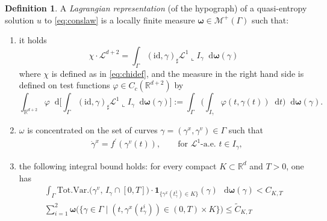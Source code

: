 \documentclass[11pt, twoside, reqno]{amsart}
\theoremstyle{definition}
\newtheorem{defi}[thm]{Definition}
\theoremstyle{remark}
\numberwithin{equation}{section}
\newcommand*\dif{\mathop{}\!\mathrm{d}}
\newcommand{\bs}[1]{\boldsymbol{#1}}
\newcommand{\msc}[1]{\mathscr{#1}}
\newcommand{\wt}[1]{\widetilde{#1}}
\begin{document}
\begin{defi}\label{def:lagrangianrep}
A \textit{Lagrangian representation} (of the hypograph) of a quasi-entropy solution $u$ to \eqref{eq:conslaw} is a locally finite measure $\bs \omega \in \msc {M}^+(\Gamma)$ such that:
\begin{enumerate}
    \item it holds
    \begin{equation}\label{eq:deflagromega}
        \chi \cdot \mathscr L^{d+2} = \int_{\Gamma} (\mathrm{id}, \gamma)_{\sharp} \mathscr L^1 \llcorner I_{\gamma} \dif \bs \omega(\gamma)
    \end{equation}
    where $\chi$ is defined as in \eqref{eq:chidef}, and the measure in the right hand side is defined on test functions $\varphi \in  C_c(\mathbb R^{d+2})$ by
    $$
    \int_{\mathbb R^{d+2}} \varphi \dif \Big[ \int_{\Gamma} (\mathrm{id}, \gamma)_{\sharp} \mathscr L^1 \llcorner I_{\gamma} \dif \bs \omega(\gamma)\Big] := \int_\Gamma \Big( \int_{I_\gamma} \varphi(t,\gamma(t)) \dif t\Big) \dif \bs \omega(\gamma).
    $$
    \item $\omega$ is concentrated on the set of curves $\gamma = (\gamma^x, \gamma^v) \in \Gamma$ such that 
    \begin{equation}\label{eq:charaeqla}
    \begin{aligned}
   &  \dot{\gamma}^x = f^{\prime}(\gamma^v(t)), \qquad \text{for $\msc L^1$-a.e. $t \in I_{\gamma}$}, 
   \end{aligned}
    \end{equation}    
    \item the following integral bound holds: for every compact $K \subset \mathbb R^d$ and $T > 0$, one has
    \begin{equation}\label{eq:CKTlr}
        \begin{aligned}
     \int_{\Gamma}  \mathrm{Tot.Var.}\big(\gamma^v, \, I_\gamma \cap [0,T]\big) \cdot \mathbf 1_{\{\gamma^x(t_\gamma^1) \in K\}}(\gamma) \,\dif \bs \omega(\gamma) < C_{K,T}\\
\sum_{i=1}^2 \bs \omega \Big(\big\{ \gamma \in \Gamma \; | \; (t,\gamma^x(t^i_\gamma)) \in (0, T) \times K \big\} \Big) \leq \wt C_{K,T}
     \end{aligned}
    \end{equation}
\end{enumerate}
\end{defi}
\end{document}
